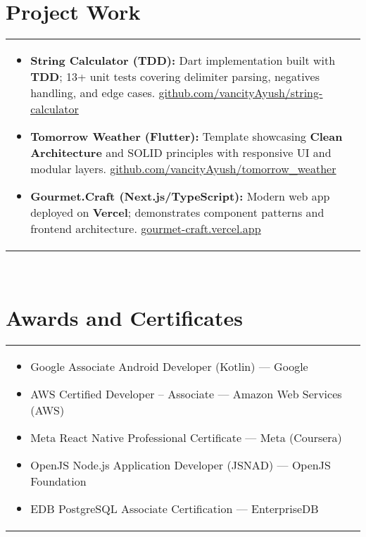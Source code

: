 \documentclass[a4paper,8pt]{article}
\begin{document}
\section{Project Work}
\begin{tabularx}{\linewidth}{ @{}l r@{} }
\begin{minipage}[t]{\linewidth}
    \begin{itemize}[nosep,after=\strut, leftmargin=2em, itemsep=2pt]
        \item \textbf{String Calculator (TDD):} Dart implementation built with \textbf{TDD}; 13+ unit tests covering delimiter parsing, negatives handling, and edge cases. \textcolor[HTML]{371e77}{\underline{\href{https://github.com/vancityAyush/string-calculator}{github.com/vancityAyush/string-calculator}}}
        \item \textbf{Tomorrow Weather (Flutter):} Template showcasing \textbf{Clean Architecture} and SOLID principles with responsive UI and modular layers. \textcolor[HTML]{371e77}{\underline{\href{https://github.com/vancityAyush/tomorrow_weather}{github.com/vancityAyush/tomorrow\_weather}}}
        \item \textbf{Gourmet.Craft (Next.js/TypeScript):} Modern web app deployed on \textbf{Vercel}; demonstrates component patterns and frontend architecture. \textcolor[HTML]{371e77}{\underline{\href{https://gourmet-craft.vercel.app}{gourmet-craft.vercel.app}}}
    \end{itemize}
    \end{minipage}
\end{tabularx}\\[3pt]

\section{Awards and Certificates}
\begin{tabularx}{\linewidth}{ @{}l r@{} }
\begin{minipage}[t]{\linewidth}
    \begin{itemize}[nosep,after=\strut, leftmargin=2em, itemsep=2pt]
        \item Google Associate Android Developer (Kotlin) — Google
        \item AWS Certified Developer – Associate — Amazon Web Services (AWS)
        \item Meta React Native Professional Certificate — Meta (Coursera)
        \item OpenJS Node.js Application Developer (JSNAD) — OpenJS Foundation
        \item EDB PostgreSQL Associate Certification — EnterpriseDB
    \end{itemize}
\end{minipage}
\end{tabularx}
\end{document}
